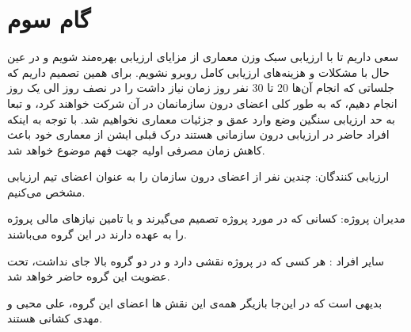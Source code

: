 \chapter{گام سوم}


سعی داریم تا با ارزیابی سبک وزن معماری از مزایای ارزیابی بهره‌مند شویم و در عین حال با مشکلات و هزینه‌های ارزیابی کامل روبرو نشویم. برای همین تصمیم داریم که جلساتی که انجام آن‌ها 20 تا 30 نفر روز زمان نیاز داشت را در نصف روز الی یک روز انجام دهیم، که به طور کلی اعضای درون سازمانمان در آن شرکت خواهند کرد، و تبعا به حد ارزیابی سنگین وضع وارد عمق و جزئیات معماری نخواهیم شد. با توجه به اینکه افراد حاضر در ارزیابی درون سازمانی هستند درک قبلی ایشن از معماری خود باعث کاهش زمان مصرفی اولیه جهت فهم موضوع خواهد شد.


\begin{itemize}

	

	 ارزیابی کنندگان: چندین نفر از اعضای درون سازمان را به عنوان اعضای تیم ارزیابی مشخص می‌کنیم.

	

	 مدیران پروژه: کسانی که در مورد پروژه تصمیم می‌گیرند و یا تامین نیازهای مالی پروژه را به عهده دارند در این گروه می‌باشند.

	

	 سایر افراد : هر کسی که در پروژه نقشی دارد و در دو گروه بالا جای نداشت، تحت عضویت این گروه حاضر خواهد شد.

	

\end{itemize}

بدیهی است که  در این‌جا بازیگر همه‌ی این نقش ها اعضای این گروه، علی محبی و مهدی کشانی هستند.



